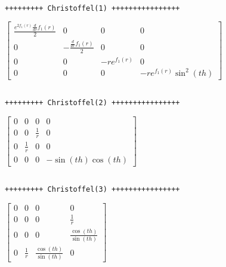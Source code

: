 \documentclass[11pt]{article}
\begin{document}
    
    \begin{Verbatim}[commandchars=\\\{\}]

+++++++++ Christoffel(1) ++++++++++++++++
    \end{Verbatim}

    $\displaystyle \left[\begin{matrix}\frac{e^{2 f_{1}{\left(r \right)}} \frac{d}{d r} f_{1}{\left(r \right)}}{2} & 0 & 0 & 0\\0 & - \frac{\frac{d}{d r} f_{1}{\left(r \right)}}{2} & 0 & 0\\0 & 0 & - r e^{f_{1}{\left(r \right)}} & 0\\0 & 0 & 0 & - r e^{f_{1}{\left(r \right)}} \sin^{2}{\left(th \right)}\end{matrix}\right]$

    
    \begin{Verbatim}[commandchars=\\\{\}]

+++++++++ Christoffel(2) ++++++++++++++++
    \end{Verbatim}

    $\displaystyle \left[\begin{matrix}0 & 0 & 0 & 0\\0 & 0 & \frac{1}{r} & 0\\0 & \frac{1}{r} & 0 & 0\\0 & 0 & 0 & - \sin{\left(th \right)} \cos{\left(th \right)}\end{matrix}\right]$

    
    \begin{Verbatim}[commandchars=\\\{\}]

+++++++++ Christoffel(3) ++++++++++++++++
    \end{Verbatim}

    $\displaystyle \left[\begin{matrix}0 & 0 & 0 & 0\\0 & 0 & 0 & \frac{1}{r}\\0 & 0 & 0 & \frac{\cos{\left(th \right)}}{\sin{\left(th \right)}}\\0 & \frac{1}{r} & \frac{\cos{\left(th \right)}}{\sin{\left(th \right)}} & 0\end{matrix}\right]$

    
    \begin{Verbatim}[commandchars=\\\{\}]

    \end{Verbatim}
\end{document}
